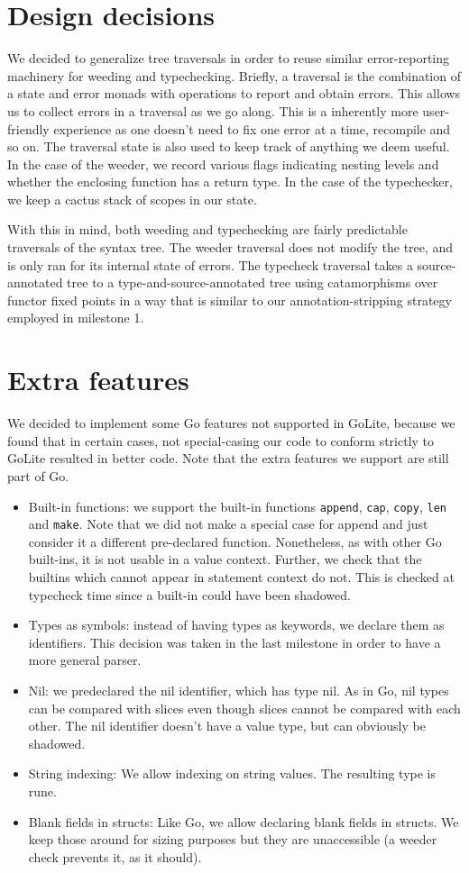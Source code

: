 \documentclass[letterpaper,11pt]{article}
\begin{document}
\section{Design decisions}
We decided to generalize tree traversals in order to reuse similar error-reporting machinery for weeding and typechecking. Briefly, a traversal is the combination of a state and error monads with operations to report and obtain errors. This allows us to collect errors in a traversal as we go along. This is a inherently more user-friendly experience as one doesn't need to fix one error at a time, recompile and so on. The traversal state is also used to keep track of anything we deem useful. In the case of the weeder, we record various flags indicating nesting levels and whether the enclosing function has a return type. In the case of the typechecker, we keep a cactus stack of scopes in our state.

With this in mind, both weeding and typechecking are fairly predictable traversals of the syntax tree. The weeder traversal does not modify the tree, and is only ran for its internal state of errors. The typecheck traversal takes a source-annotated tree to a type-and-source-annotated tree using catamorphisms over functor fixed points in a way that is similar to our annotation-stripping strategy employed in milestone 1.

\section{Extra features}
We decided to implement some Go features not supported in GoLite, because we found that in certain cases, not special-casing our code to conform strictly to GoLite resulted in better code. Note that the extra features we support are still part of Go.
\begin{itemize}
\item Built-in functions: we support the built-in functions \texttt{append}, \texttt{cap}, \texttt{copy}, \texttt{len} and \texttt{make}. Note that we did not make a special case for append and just consider it a different pre-declared function. Nonetheless, as with other Go built-ins, it is not usable in a value context. Further, we check that the builtins which cannot appear in statement context do not. This is checked at typecheck time since a built-in could have been shadowed.
\item Types as symbols: instead of having types as keywords, we declare them as identifiers. This decision was taken in the last milestone in order to have a more general parser.
\item Nil: we predeclared the nil identifier, which has type nil. As in Go, nil types can be compared with slices even though slices cannot be compared with each other. The nil identifier doesn't have a value type, but can obviously be shadowed.
\item String indexing: We allow indexing on string values. The resulting type is rune.
\item Blank fields in structs: Like Go, we allow declaring blank fields in structs. We keep those around for sizing purposes but they are unaccessible (a weeder check prevents it, as it should).
\end{itemize}
\end{document}
